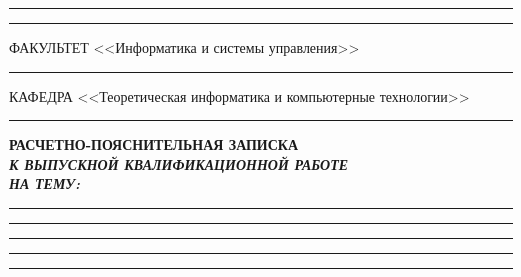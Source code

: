 \documentclass[14pt, russian]{scrartcl}
\begin{document}
\begin{titlepage}
\vspace{-2pt}
\hspace{-34.5pt}\rule{\textwidth}{2.5pt}

\vspace*{-20.3pt}
\hspace{-34.5pt}\rule{\textwidth}{0.4pt}
\vspace{0.5ex}
\noindent \small ФАКУЛЬТЕТ\hspace{80pt} <<Информатика и системы управления>>

\vspace*{-16pt}
\hspace{35pt}\rule{0.855\textwidth}{0.4pt}

\vspace{0.5ex}
\noindent \small КАФЕДРА\hspace{50pt} <<Теоретическая информатика и компьютерные технологии>>

\vspace*{-16pt}
\hspace{25pt}\rule{0.875\textwidth}{0.4pt}
 
 
\vspace{3em}
 
\begin{center}
\Large \bf{РАСЧЕТНО-ПОЯСНИТЕЛЬНАЯ ЗАПИСКА\\\textbf{\textit{К ВЫПУСКНОЙ КВАЛИФИКАЦИОННОЙ РАБОТЕ\\НА ТЕМУ:}} \\}
\end{center}

\vspace*{-6ex} 
\begin{center}
\Large{\textit{\textbf{}}}

\vspace*{-3ex}
\rule{0.9\textwidth}{1.2pt}

\Large{\textit{\textbf{}}}

\vspace*{-3ex}
\rule{0.9\textwidth}{1.2pt}

\vspace*{-0.2ex}
\rule{0.9\textwidth}{1.2pt}

\vspace*{-0.2ex}
\rule{0.9\textwidth}{1.2pt}

\vspace*{-0.2ex}
\rule{0.9\textwidth}{1.2pt}
\end{center}

\vspace{\fill}
 


\end{titlepage}
\end{document}
